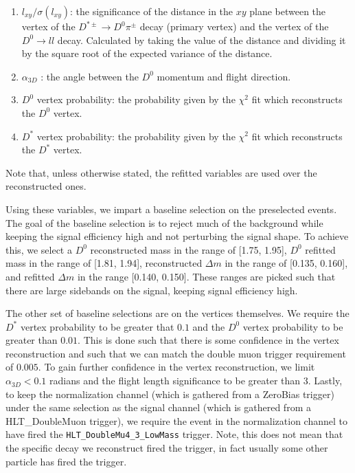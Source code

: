 \begin{enumerate}
    \item $l_{xy}/\sigma\left(l_{xy}\right)$: the significance of the distance in the $xy$ plane between the vertex of the $D^{*\pm} \to D^0 \pi^\pm$ decay (primary vertex) and the vertex of the $D^0 \to l l$ decay. Calculated by taking the value of the distance and dividing it by the square root of the expected variance of the distance. 
    \item $\alpha_{3D}$ : the angle between the $D^0$ momentum and flight direction. 
    \item $D^0$ vertex probability: the probability given by the $\chi^2$ fit which reconstructs the $D^0$ vertex.
    \item $D^*$ vertex probability: the probability given by the $\chi^2$ fit which reconstructs the $D^*$ vertex.
\end{enumerate}
Note that, unless otherwise stated, the refitted variables are used over the reconstructed ones. 

Using these variables, we impart a baseline selection on the preselected events. The goal of the baseline selection is to reject much of the background while keeping the signal efficiency high and not perturbing the signal shape. To achieve this, we select a $D^0$ reconstructed mass in the range of [1.75, 1.95], $D^0$ refitted mass in the range of [1.81, 1.94], reconstructed $\Delta m$ in the range of [0.135, 0.160], and refitted $\Delta m$ in the range [0.140, 0.150]. These ranges are picked such that there are large sidebands on the signal, keeping signal efficiency high.

The other set of baseline selections are on the vertices themselves. We require the $D^*$ vertex probability to be greater that $0.1$ and the $D^0$ vertex probability to be greater than $0.01$. This is done such that there is some confidence in the vertex reconstruction and such that we can match the double muon trigger requirement of $0.005$. To gain further confidence in the vertex reconstruction, we limit $\alpha_{3D} < 0.1$ radians and the flight length significance to be greater than 3. Lastly, to keep the normalization channel (which is gathered from a ZeroBias trigger) under the same selection as the signal channel (which is gathered from a HLT\_DoubleMuon trigger), we require the event in the normalization channel to have fired the \texttt{HLT\_DoubleMu4\_3\_LowMass} trigger. Note, this does not mean that the specific decay we reconstruct fired the trigger, in fact usually some other particle has fired the trigger. 

